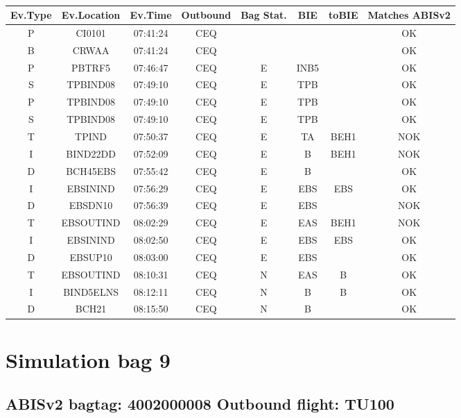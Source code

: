 \documentclass{report}
\begin{document}
\paragraph{}
\begin{longtable}{cccccccc}    \toprule
\rowcolor{white!50}
\textbf{Ev.Type} & \textbf{Ev.Location} & \textbf{Ev.Time} & \textbf{Outbound} & \textbf{Bag Stat.} & \textbf{BIE} & \textbf{toBIE} & \textbf{Matches ABISv2} \\\midrule
P & CI0101 & 07:41:24  & CEQ &  &  &  & OK\\
B & CRWAA & 07:41:24  & CEQ &  &  &  & OK\\
P & PBTRF5 & 07:46:47  & CEQ & E & INB5 &  & OK\\
S & TPBIND08 & 07:49:10  & CEQ & E & TPB &  & OK\\
P & TPBIND08 & 07:49:10  & CEQ & E & TPB &  & OK\\
S & TPBIND08 & 07:49:10  & CEQ & E & TPB &  & OK\\
T & TPIND & 07:50:37  & CEQ & E & TA & BEH1 & NOK\\
I & BIND22DD & 07:52:09  & CEQ & E & B & BEH1 & NOK\\
D & BCH45EBS & 07:55:42  & CEQ & E & B &  & OK\\
I & EBSININD & 07:56:29  & CEQ & E & EBS & EBS & OK\\
D & EBSDN10 & 07:56:39  & CEQ & E & EBS &  & NOK\\
T & EBSOUTIND & 08:02:29  & CEQ & E & EAS & BEH1 & NOK\\
I & EBSININD & 08:02:50  & CEQ & E & EBS & EBS & OK\\
D & EBSUP10 & 08:03:00  & CEQ & E & EBS &  & OK\\
T & EBSOUTIND & 08:10:31  & CEQ & N & EAS & B & OK\\
I & BIND5ELNS & 08:12:11  & CEQ & N & B & B & OK\\
D & BCH21 & 08:15:50  & CEQ & N & B &  & OK\\
\bottomrule
\end{longtable}
\pagebreak
\section*{Simulation bag 9}
\subsection*{ABISv2 bagtag: 4002000008 Outbound flight: TU100}
\end{document}
